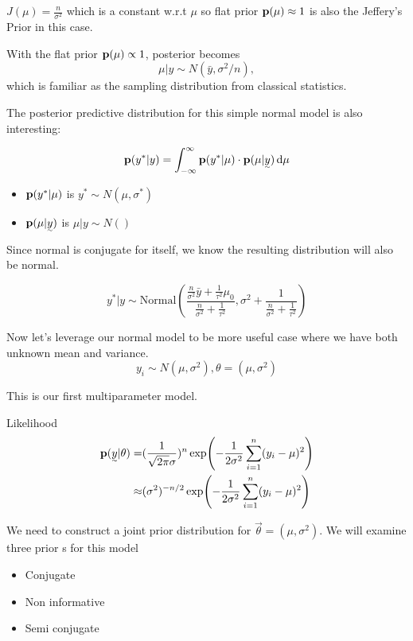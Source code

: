 $J(\mu) = \frac{n}{\sigma^2}$ which is a constant w.r.t $\mu$ so flat prior ${\mathbf p}(\mu) \approx 1$ is also the Jeffery's Prior in this case.

With the flat prior ${\mathbf p}(\mu) \propto 1$, posterior becomes
\[
\mu | y \sim N(\bar{y}, \sigma^2/n),
\]
which is familiar as the sampling distribution from classical statistics.

The posterior predictive distribution for this simple normal model is also interesting:

\[
\p(y^*| y) = \int_{-\infty}^{\infty} \p(y^*| \mu) \cdot \p(\mu| \vec{y}) \diff \mu 
\]

\begin{itemize}
    \item ${\mathbf p}(y^*| \mu)$ is $y^* \sim N(\mu, \sigma^*)$
    \item $\p(\mu| \vec{y})$ is $\mu|y \sim N()$
\end{itemize}

Since normal is conjugate for itself, we know the resulting distribution will also be normal.

\[
y^*|y \sim \text{Normal}(
\frac{\frac{n}{\sigma^2} \bar{y} + \frac{1}{\tau^2} \mu_0}{ \frac{n}{\sigma^2} + \frac{1}{\tau^2}},
\sigma^2 + \frac{1}{\frac{n}{\sigma^2} + \frac{1}{\tau^2}})
\]

Now let's leverage our normal model to be more useful case where we have both unknown mean and variance.
\[
y_i \sim N(\mu, \sigma^2), \theta = (\mu, \sigma^2)
\]

This is our first multiparameter model.

Likelihood
\begin{align*}
    \p(\vec{y}| \theta) 
    =& (\frac{1}{\sqrt{2\pi}\sigma})^n \exp(-\frac{1}{2\sigma^2} \sum_{i=1}^n(y_i - \mu)^2)\\
    \approx& (\sigma^2)^{-n/2} \exp(-\frac{1}{2\sigma^2} \sum_{i=1}^n(y_i - \mu)^2)
\end{align*}

We need to construct a joint prior distribution for $\vec{\theta} = (\mu, \sigma^2)$. We will examine three prior s for this model
\begin{itemize}
    \item Conjugate
    \item Non informative
    \item Semi conjugate
\end{itemize}

